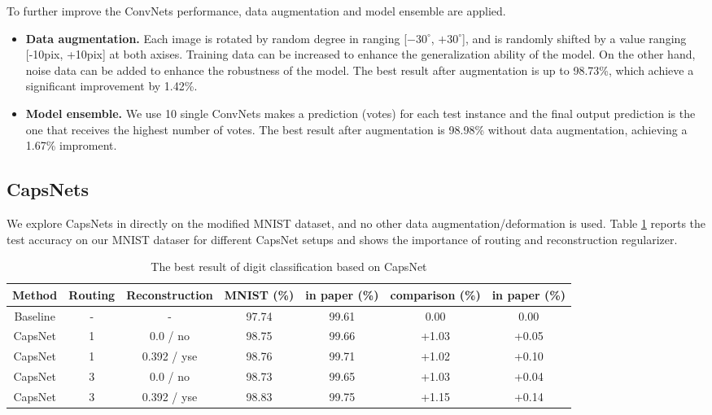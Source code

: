 \documentclass{article} %
\begin{document}
To further improve the ConvNets performance, data augmentation and model ensemble are applied.
\begin{itemize}
	\item \textbf{Data augmentation.}  Each image is rotated by random degree in ranging [$-30^{\circ}$, $+30^{\circ}$],  and is randomly shifted by a value ranging [-10pix, +10pix] at both axises. Training data can be increased to enhance the generalization ability of the model. On the other hand, noise data can be added to enhance the robustness of the model. The best result after augmentation is up to 98.73\%, which achieve a significant improvement by 1.42\%.
	\item \textbf{Model ensemble.} We use 10 single ConvNets makes a prediction (votes) for each test instance and the final output prediction is the one that receives the highest number of votes. The best result after augmentation is 98.98\% without data augmentation, achieving a 1.67\% improment.
\end{itemize}

\subsection{CapsNets }
We explore CapsNets in \cite{capsnet} directly on the modified MNIST dataset, and no other data augmentation/deformation is used. Table \ref{tb:capsulresult} reports the test accuracy on our MNIST dataser for different CapsNet setups and shows the importance of routing and reconstruction regularizer.
\begin{table}[htbp]
	\centering
	\caption{The best result of digit classification based on CapsNet}
	\label{tb:capsulresult}
	\begin{tabular}{ccccccc}
		\hline
		Method & Routing & Reconstruction & MNIST (\%) & in paper (\%) & comparison (\%) & in paper (\%)\\
		\hline
		Baseline & - & - & 97.74 & 99.61 & 0.00 & 0.00\\
		CapsNet & 1 & 0.0 / no & 98.75 & 99.66 & +1.03 & +0.05\\
		CapsNet & 1 & 0.392 / yse & 98.76 & 99.71 &+1.02 & +0.10 \\
		CapsNet & 3 & 0.0 / no & 98.73 & 99.65 & +1.03 & +0.04\\
		CapsNet & 3 & 0.392 / yse & 98.83 & 99.75 & +1.15 & +0.14\\
		\hline
	\end{tabular}
\end{table}
\end{document}
